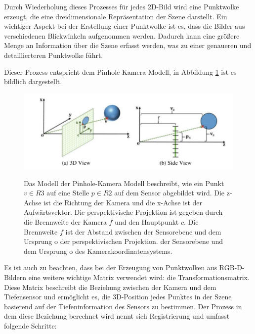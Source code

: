 Durch Wiederholung dieses Prozesses für jedes 2D-Bild wird eine Punktwolke erzeugt, die eine dreidimensionale Repräsentation der Szene darstellt. Ein wichtiger Aspekt bei der Erstellung einer Punktwolke ist es, dass die Bilder aus verschiedenen Blickwinkeln aufgenommen werden. Dadurch kann eine größere Menge an Information über die Szene erfasst werden, was zu einer genaueren und detaillierteren Punktwolke führt.

Dieser Prozess entspricht dem Pinhole Kamera Modell, in Abbildung \ref{fig:3dtransformation} ist es bildlich dargestellt.

\begin{figure}
    \includegraphics[width=\textwidth]{./images/transformation.png}
    \label{fig:3dtransformation}
    \caption{Das Modell der Pinhole-Kamera
    Modell beschreibt, wie ein Punkt $v \in R3$ auf eine Stelle $p \in R2$ auf dem Sensor abgebildet wird. Die z-Achse ist die
    Richtung der Kamera und die x-Achse ist der Aufwärtsvektor. Die perspektivische Projektion ist gegeben durch
    die Brennweite der Kamera $f$ und den Hauptpunkt $c$. Die Brennweite $f$ ist der Abstand zwischen der Sensorebene und dem Ursprung o der perspektivischen Projektion.
    der Sensorebene und dem Ursprung o des Kamerakoordinatensystems.\cite[vgl. S.6]{SWB-1681722674}}
\end{figure}

Es ist auch zu beachten, dass bei der Erzeugung von Punktwolken aus \ac{RGB-D}-Bildern eine weitere wichtige Matrix verwendet wird: die Transformationsmatrix. Diese Matrix beschreibt die Beziehung zwischen der Kamera und dem Tiefensensor und ermöglicht es, die 3D-Position jedes Punktes in der Szene basierend auf der Tiefeninformation des Sensors zu bestimmen. Der Prozess in dem diese Beziehung berechnet wird nennt sich Registrierung und umfasst folgende Schritte:

